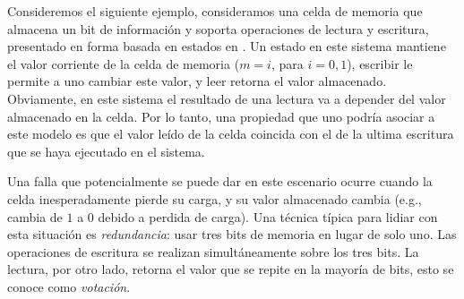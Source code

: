	
\begin{example}
Consideremos el siguiente ejemplo, consideramos una celda de memoria que almacena un bit de información y soporta operaciones de lectura y escritura, presentado en forma basada en estados en \cite{DemasiCMA17}. Un estado en este sistema mantiene el valor corriente de la celda de memoria ($m=i$, para $i=0,1$), escribir le permite a uno cambiar este valor, y leer retorna el valor almacenado.  
Obviamente, en este sistema el resultado de una lectura va a depender del valor almacenado en la celda. 
Por lo tanto, una propiedad que uno podría asociar a este modelo es que el valor leído de la celda coincida con el de la ultima escritura que se haya ejecutado en el sistema.
    
Una falla que potencialmente se puede dar en este escenario ocurre cuando la celda inesperadamente pierde su carga, y su valor almacenado cambia (e.g., cambia de $1$ a $0$ debido a perdida de carga). Una técnica típica para lidiar con esta situación es \emph{redundancia}: usar tres bits de memoria en lugar de solo uno. Las operaciones de escritura se realizan simultáneamente sobre los tres bits. La lectura, por otro lado, retorna el valor que se repite en la mayoría de bits, esto se conoce como \emph{votación}. 


\end{example}
